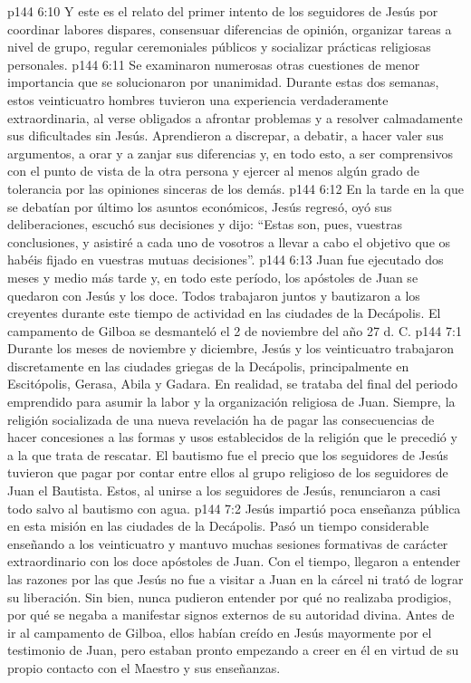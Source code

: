 \vs p144 6:10 Y este es el relato del primer intento de los seguidores de Jesús por coordinar labores dispares, consensuar diferencias de opinión, organizar tareas a nivel de grupo, regular ceremoniales públicos y socializar prácticas religiosas personales.
\vs p144 6:11 Se examinaron numerosas otras cuestiones de menor importancia que se solucionaron por unanimidad. Durante estas dos semanas, estos veinticuatro hombres tuvieron una experiencia verdaderamente extraordinaria, al verse obligados a afrontar problemas y a resolver calmadamente sus dificultades sin Jesús. Aprendieron a discrepar, a debatir, a hacer valer sus argumentos, a orar y a zanjar sus diferencias y, en todo esto, a ser comprensivos con el punto de vista de la otra persona y ejercer al menos algún grado de tolerancia por las opiniones sinceras de los demás.
\vs p144 6:12 En la tarde en la que se debatían por último los asuntos económicos, Jesús regresó, oyó sus deliberaciones, escuchó sus decisiones y dijo: “Estas son, pues, vuestras conclusiones, y asistiré a cada uno de vosotros a llevar a cabo el objetivo que os habéis fijado en vuestras mutuas decisiones”.
\vs p144 6:13 Juan fue ejecutado dos meses y medio más tarde y, en todo este período, los apóstoles de Juan se quedaron con Jesús y los doce. Todos trabajaron juntos y bautizaron a los creyentes durante este tiempo de actividad en las ciudades de la Decápolis. El campamento de Gilboa se desmanteló el 2 de noviembre del año 27 d. C.
\vs p144 7:1 Durante los meses de noviembre y diciembre, Jesús y los veinticuatro trabajaron discretamente en las ciudades griegas de la Decápolis, principalmente en Escitópolis, Gerasa, Abila y Gadara. En realidad, se trataba del final del periodo emprendido para asumir la labor y la organización religiosa de Juan. Siempre, la religión socializada de una nueva revelación ha de pagar las consecuencias de hacer concesiones a las formas y usos establecidos de la religión que le precedió y a la que trata de rescatar. El bautismo fue el precio que los seguidores de Jesús tuvieron que pagar por contar entre ellos al grupo religioso de los seguidores de Juan el Bautista. Estos, al unirse a los seguidores de Jesús, renunciaron a casi todo salvo al bautismo con agua.
\vs p144 7:2 Jesús impartió poca enseñanza pública en esta misión en las ciudades de la Decápolis. Pasó un tiempo considerable enseñando a los veinticuatro y mantuvo muchas sesiones formativas de carácter extraordinario con los doce apóstoles de Juan. Con el tiempo, llegaron a entender las razones por las que Jesús no fue a visitar a Juan en la cárcel ni trató de lograr su liberación. Sin bien, nunca pudieron entender por qué no realizaba prodigios, por qué se negaba a manifestar signos externos de su autoridad divina. Antes de ir al campamento de Gilboa, ellos habían creído en Jesús mayormente por el testimonio de Juan, pero estaban pronto empezando a creer en él en virtud de su propio contacto con el Maestro y sus enseñanzas.
